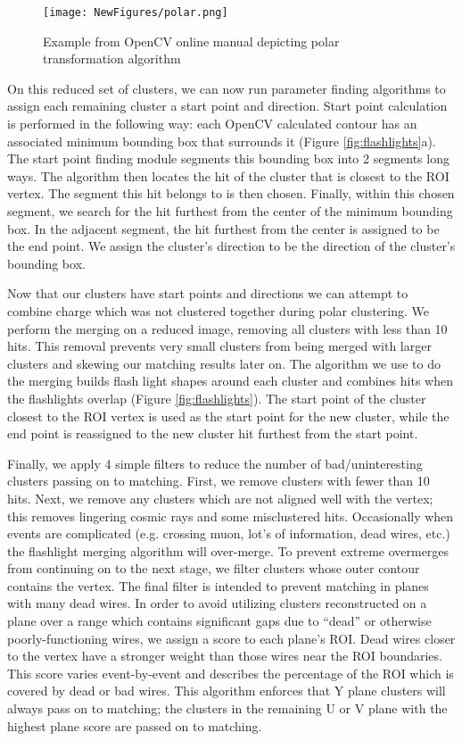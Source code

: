 \documentclass[12pt]{article}
\begin{document}
\begin{figure}[h!]
\centering
\texttt{[image: NewFigures/polar.png]}
\caption{ Example from OpenCV online manual depicting polar transformation algorithm }
\label{fig:polar}
\end{figure}

\par On this reduced set of clusters, we can now run parameter finding algorithms to assign each remaining cluster a start point and direction. Start point calculation is performed in the following way: each OpenCV calculated contour has an associated minimum bounding box that surrounds it (Figure \ref{fig:flashlights}a). The start point finding module segments this bounding box into 2 segments long ways. The algorithm then locates the hit of the cluster that is closest to the ROI vertex.  The segment this hit belongs to is then chosen. Finally, within this chosen segment, we search for the hit furthest from the center of the minimum bounding box. In the adjacent segment, the hit furthest from the center is assigned to be the end point. We assign the cluster's direction to be the direction of the cluster's bounding box.
\par Now that our clusters have start points and directions we can attempt to combine charge which was not clustered together during polar clustering. We perform the merging on a reduced image, removing all clusters with less than 10 hits. This removal prevents very small clusters from being merged with larger clusters and skewing our matching results later on.  The algorithm we use to do the merging builds flash light shapes around each cluster and combines hits when the flashlights overlap (Figure \ref{fig:flashlights}). The start point of the cluster closest to the ROI vertex is used as the start point for the new cluster, while the end point is reassigned to the new cluster hit furthest from the start point.
\par Finally, we apply 4 simple filters to reduce the number of bad/uninteresting clusters passing on to matching. First, we remove clusters with fewer than 10 hits.  Next, we remove any clusters which are not aligned well with the vertex; this removes lingering cosmic rays and some misclustered hits. Occasionally when events are complicated (e.g. crossing muon, lot's of information, dead wires, etc.) the flashlight merging algorithm will over-merge.  To prevent extreme overmerges from continuing on to the next stage, we filter clusters whose outer contour contains the vertex. The final filter is intended to prevent matching in planes with many dead wires.  In order to avoid utilizing clusters reconstructed on a plane over a range which contains significant gaps due to ``dead'' or otherwise poorly-functioning wires, we assign a score to each plane's ROI. Dead wires closer to the vertex have a stronger weight than those wires near the ROI boundaries. This score varies event-by-event and describes the percentage of the ROI which is covered by dead or bad wires. This algorithm enforces that Y plane clusters will always pass on to matching; the clusters in the remaining U or V plane with the highest plane score are passed on to matching. 
\end{document}

